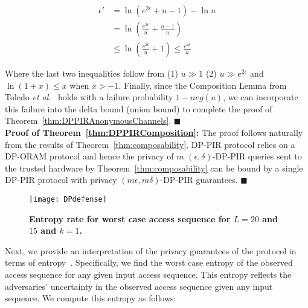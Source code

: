 \documentclass[USenglish,oneside,twocolumn]{article}
\makeatletter
\newcommand{\etal}{\textit{et al}.}
\let\origsection\section
\renewcommand\section{\@ifstar{\starsection}{\nostarsection}}
\newcommand\nostarsection[1]
{\sectionprelude\origsection{#1}\sectionpostlude}
\newcommand\starsection[1]
{\sectionprelude\origsection*{#1}\sectionpostlude}
\newcommand\sectionprelude{\vspace{-1em}
}
\newcommand\sectionpostlude{\vspace{-1em}
}
\makeatother
\begin{document}
\begin{align*}
\epsilon' &= \ln \left(e^{2\epsilon} + u - 1 \right) - \ln u \\
&= \ln \left( \frac{e^{2\epsilon}}{u} + \frac{u - 1}{u}\right) \\
&\leq \ln \left( \frac{e^{2\epsilon}}{u} + 1 \right) \leq \frac{e^{2\epsilon}}{u}  
\end{align*}

Where the last two inequalities follow from (1) $u \gg 1$ (2) $u \gg e^{2\epsilon}$ and $\ln (1 + x) \leq x$ when $x > -1$. Finally, since the Composition Lemma from Toledo \etal~\cite{goldbergDPPIR} holds with a failure probability $1 - neg(u)$, we can incorporate this failure into the delta bound (union bound) to complete the proof of Theorem~\ref{thm:DPPIRAnonymousChannels}. $\blacksquare$\\




\textbf{Proof of Theorem~\ref{thm:DPPIRComposition}: }The proof follows naturally from the results of Theorem~\ref{thm:composability}. DP-PIR protocol relies on a DP-ORAM protocol and hence the privacy of $m$ $(\epsilon, \delta)$-DP-PIR queries sent to the trusted hardware by Theorem~\ref{thm:composability} can be bound by a single DP-PIR protocol with privacy $(m\epsilon, m\delta)$-DP-PIR guarantees. $\blacksquare$



\begin{figure}[!tp]
\centering
\texttt{[image: DPdefense]}
\vspace{-5pt}
\caption{\textbf{Entropy rate for worst case access sequence for $L = 20$ and $15$ and $k = 1$.}}
\label{fig:entropyrate}
\end{figure}


\section{Entropy Calculation for DP}\label{appendix:DPdefense}
Next, we provide an interpretation of the privacy guarantees of the protocol in terms of entropy~\cite{paulDP}. Specifically, we find the worst case entropy of the observed access sequence for any given input access sequence. This entropy reflects the adversaries' uncertainty in the observed access sequence given any input sequence. We compute this entropy as follows:
\end{document}
